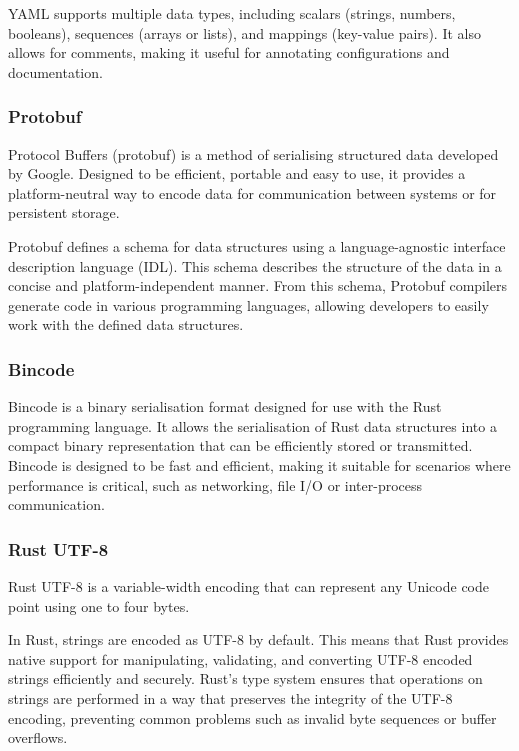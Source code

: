 YAML supports multiple data types, including scalars (strings, numbers, booleans), sequences (arrays or lists), and mappings (key-value pairs). It also allows for comments, making it useful for annotating configurations and documentation.

\subsubsection{Protobuf}
Protocol Buffers (protobuf) is a method of serialising structured data developed by Google. Designed to be efficient, portable and easy to use, it provides a platform-neutral way to encode data for communication between systems or for persistent storage.

Protobuf defines a schema for data structures using a language-agnostic interface description language (IDL). This schema describes the structure of the data in a concise and platform-independent manner. From this schema, Protobuf compilers generate code in various programming languages, allowing developers to easily work with the defined data structures.

\subsubsection{Bincode}
Bincode is a binary serialisation format designed for use with the Rust programming language. It allows the serialisation of Rust data structures into a compact binary representation that can be efficiently stored or transmitted. Bincode is designed to be fast and efficient, making it suitable for scenarios where performance is critical, such as networking, file I/O or inter-process communication.

\subsubsection{Rust UTF-8}
Rust UTF-8 is a variable-width encoding that can represent any Unicode code point using one to four bytes.

In Rust, strings are encoded as UTF-8 by default. This means that Rust provides native support for manipulating, validating, and converting UTF-8 encoded strings efficiently and securely. Rust's type system ensures that operations on strings are performed in a way that preserves the integrity of the UTF-8 encoding, preventing common problems such as invalid byte sequences or buffer overflows.


